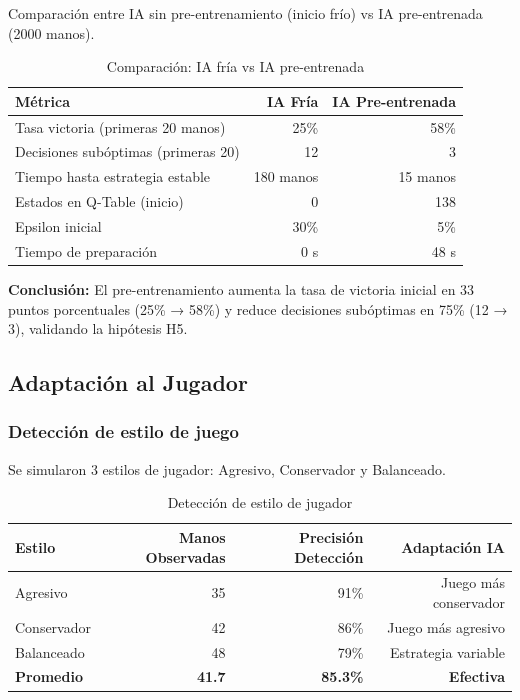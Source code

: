 \documentclass[12pt,a4paper]{article}
\begin{document}
Comparación entre IA sin pre-entrenamiento (inicio frío) vs IA pre-entrenada (2000 manos).

\begin{table}[H]
\centering
\caption{Comparación: IA fría vs IA pre-entrenada}
\begin{tabular}{|l|r|r|}
\hline
\textbf{Métrica} & \textbf{IA Fría} & \textbf{IA Pre-entrenada} \\
\hline
Tasa victoria (primeras 20 manos) & 25\% & 58\% \\
\hline
Decisiones subóptimas (primeras 20) & 12 & 3 \\
\hline
Tiempo hasta estrategia estable & 180 manos & 15 manos \\
\hline
Estados en Q-Table (inicio) & 0 & 138 \\
\hline
Epsilon inicial & 30\% & 5\% \\
\hline
Tiempo de preparación & 0 s & 48 s \\
\hline
\end{tabular}
\label{tab:comparacion_preentrenamiento}
\end{table}

\textbf{Conclusión:} El pre-entrenamiento aumenta la tasa de victoria inicial en 33 puntos porcentuales (25\% → 58\%) y reduce decisiones subóptimas en 75\% (12 → 3), validando la hipótesis H5.

\subsection{Adaptación al Jugador}

\subsubsection{Detección de estilo de juego}

Se simularon 3 estilos de jugador: Agresivo, Conservador y Balanceado.

\begin{table}[H]
\centering
\caption{Detección de estilo de jugador}
\begin{tabular}{|l|r|r|r|}
\hline
\textbf{Estilo} & \textbf{Manos Observadas} & \textbf{Precisión Detección} & \textbf{Adaptación IA} \\
\hline
Agresivo & 35 & 91\% & Juego más conservador \\
\hline
Conservador & 42 & 86\% & Juego más agresivo \\
\hline
Balanceado & 48 & 79\% & Estrategia variable \\
\hline
\textbf{Promedio} & \textbf{41.7} & \textbf{85.3\%} & \textbf{Efectiva} \\
\hline
\end{tabular}
\label{tab:deteccion_estilo}
\end{table}
\end{document}
